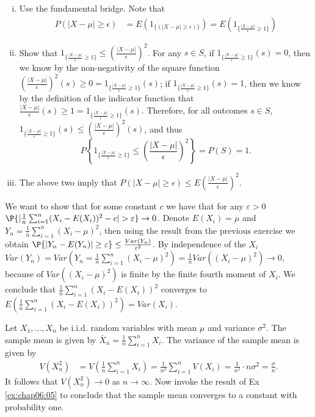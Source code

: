 \begin{Solution}{1.10}
			\begin{enumerate}[i.]
			\item Use the fundamental bridge. Note that
			\begin{equation*}
				\begin{array}{cl}
					P(|X-\mu|\geq \epsilon) &= E(1_{\{\left( |X-\mu|\geq \epsilon\right) \}})= E(1_{\{  \frac{|X-\mu|}{\epsilon}\geq 1  \}})
				\end{array}
			\end{equation*}
			\item Show that $1_{\{ \frac{|X-\mu|}{\epsilon}\geq 1  \}}\leq \left( \frac{|X-\mu|}{\epsilon}\right)^2 $. For any $s\in S$, if $1_{\{ \frac{|X-\mu|}{\epsilon}\geq 1  \}}(s)=0$, then we know by the non-negativity of the square function $\left( \frac{|X-\mu|}{\epsilon}\right)^2(s)\geq 0=1_{\{ \frac{|X-\mu|}{\epsilon}\geq 1  \}}(s)$;  if $1_{\{ \frac{|X-\mu|}{\epsilon}\geq 1  \}}(s)=1$, then we know by the definition of the indicator function that $\frac{|X-\mu|}{\epsilon}(s)\geq 1 =1_{\{ \frac{|X-\mu|}{\epsilon}\geq 1  \}}(s)$. Therefore, for all outcomes $s\in S$, $1_{\{ \frac{|X-\mu|}{\epsilon}\geq 1  \}}(s)\leq \left( \frac{|X-\mu|}{\epsilon}\right)^2(s)$, and thus $$P\left\{1_{\{ \frac{|X-\mu|}{\epsilon}\geq 1  \}}\leq \left( \frac{|X-\mu|}{\epsilon}\right)^2\right\}=P(S)=1. $$
			\item The above two imply that $P(|X-\mu|\geq \epsilon)\leq E\left( \frac{|X-\mu|}{\epsilon}\right)^2$.
		\end{enumerate}
	
\end{Solution}
\begin{Solution}{1.11}
		We want to show that for some constant $c$ we have that for any $\varepsilon>0$ $\P{|\frac{1}{n}\sum_{i=1}^n(X_{i}-E(X_i))^2-c|>\varepsilon}\rightarrow 0$. Denote $E(X_i)=\mu$ and $Y_n=\frac{1}{n}\sum_{i=1}^n(X_{i}-\mu)^2$, then using the result from the previous exercise we obtain $\P{|Y_n-E(Y_n)|\geq\varepsilon}\leq \frac{Var(Y_n)}{\varepsilon^2}$. By independence of the $X_i$ $Var(Y_n)=Var(Y_n=\frac{1}{n}\sum_{i=1}^n(X_{i}-\mu)^2)=\frac{1}{n}Var((X_i-\mu)^2)\rightarrow 0$, because of $Var((X_i-\mu)^2)$ is finite by the finite fourth moment of $X_i$. We conclude that $\frac{1}{n}\sum_{i=1}^n(X_{i}-E(X_i))^2$ converges to $E(\frac{1}{n}\sum_{i=1}^n(X_{i}-E(X_i))^2)=Var(X_i)$.
	
\end{Solution}
\begin{Solution}{1.12}
			Let $X_1, \ldots, X_n$ be i.i.d. random variables with mean $\mu$ and variance $\sigma^2$. The sample mean is given by $\bar{X}_n = \frac{1}{n} \sum_{i = 1}^n X_i$. The variance of the sample mean is given by
			\begin{align*}
				V(X_n^2) & = V\left(\frac{1}{n} \sum_{i = 1}^n X_i\right) = \frac{1}{n^2} \sum_{i = 1}^n V(X_i) = \frac{1}{n^2} \cdot n \sigma^2 = \frac{\sigma}{n}.
			\end{align*}	
			It follows that $V(X_n^2) \to 0$ as $n \to \infty$. Now invoke the result of Ex \ref{ex:chap06:05} to conclude that the sample mean converges to a constant with probability one.
		
\end{Solution}
